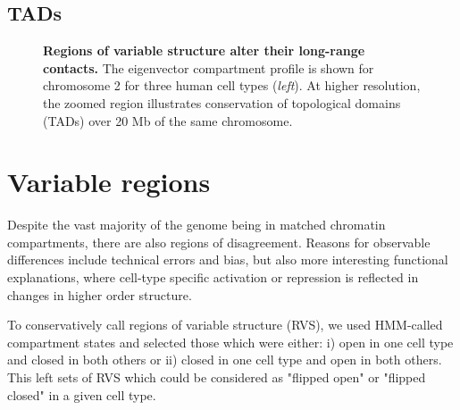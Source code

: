\documentclass[a4paper,10pt,oneside]{book}
\begin{document}


\subsection{TADs}

\begin{figure}
\begin{center} 
\captionsetup{width=\textwidth} 
\caption{ {\bf Regions of variable structure alter their long-range contacts. }
The eigenvector compartment profile is shown for chromosome 2 for three human cell types (\emph{left}).  At higher resolution, the zoomed region illustrates conservation of topological domains (TADs) over 20 Mb of the same chromosome.
}\label{fig:blowout}
\end{center} 
\end{figure} 


\section{Variable regions}

Despite the vast majority of the genome being in matched chromatin compartments, there are also regions of disagreement. Reasons for observable differences include technical errors and bias, but also more interesting functional explanations, where cell-type specific activation or repression is reflected in changes in higher order structure.

To conservatively call regions of variable structure (RVS), we used HMM-called compartment states and selected those which were either: i) open in one cell type and closed in both others or ii) closed in one cell type and open in both others. This left sets of RVS which could be considered as "flipped open" or "flipped closed" in a given cell type.
\end{document}
